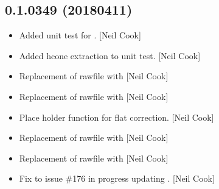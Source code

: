 \documentclass[a4paper,10pt,english]{report}
\begin{document}
\subsection{0.1.0349 (2018\sphinxhyphen{}04\sphinxhyphen{}11)}
\label{\detokenize{misc/changelog:id483}}\begin{itemize}
\item {} 
Added unit test for . {[}Neil Cook{]}

\item {} 
Added hcone extraction to unit test. {[}Neil Cook{]}

\item {} 
Replacement of rawfile with  {[}Neil Cook{]}

\item {} 
Replacement of rawfile with  {[}Neil Cook{]}

\item {} 
Place holder function for flat correction. {[}Neil Cook{]}

\item {} 
Replacement of rawfile with  {[}Neil Cook{]}

\item {} 
Replacement of rawfile with  {[}Neil Cook{]}

\item {} 
Fix to issue \#176 \sphinxhyphen{} in progress \sphinxhyphen{} updating . {[}Neil Cook{]}

\end{itemize}
\end{document}
